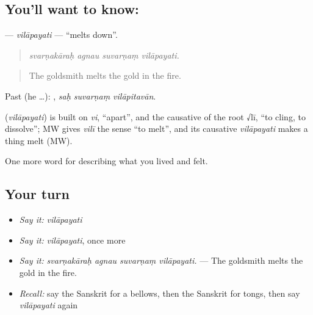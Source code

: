\subsection*{You'll want to know: }
\textbf{} — \emph{vilāpayati} — \textquotedblleft{}melts down\textquotedblright{}.

\begin{quote}
   
\end{quote}

\begin{quote}
\emph{svarṇakāraḥ agnau suvarṇaṃ vilāpayati.}
\end{quote}

\begin{quote}
The goldsmith melts the gold in the fire.
\end{quote}

Past (he …):   , \emph{saḥ suvarṇaṃ vilāpitavān}.

\begin{cousinweb}
\textbf{} (\emph{vilāpayati}) is built on \emph{vi}, \textquotedblleft{}apart\textquotedblright{}, and the causative of the root √lī, \textquotedblleft{}to cling, to dissolve\textquotedblright{}; MW gives \emph{vilī} the sense \textquotedblleft{}to melt\textquotedblright{}, and its causative \emph{vilāpayati} makes a thing melt (MW).
\end{cousinweb}

\begin{grammarlens}[title={What you've built}]
One more word for describing what you lived and felt.
\end{grammarlens}

\subsection*{Your turn}
\begin{itemize}
\raggedright
  \item \emph{Say it:} \emph{vilāpayati}
  \item \emph{Say it:} \emph{vilāpayati}, once more
  \item \emph{Say it:} \emph{svarṇakāraḥ agnau suvarṇaṃ vilāpayati.} — The goldsmith melts the gold in the fire.
  \item \emph{Recall:} say the Sanskrit for a bellows, then the Sanskrit for tongs, then say \emph{vilāpayati} again
\end{itemize}


